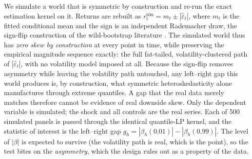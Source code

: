 We simulate a world that is symmetric by construction and re-run the exact
estimation kernel on it. Returns are rebuilt as $r^{\text{sim}}_t = m_t \pm
|\hat{\varepsilon}_t|$, where $m_t$ is the fitted conditional mean and the
sign is an independent Rademacher draw, the sign-flip construction of
the wild-bootstrap literature \citep{wu1986,liu1988,davidson2008}. The
simulated world thus has \emph{zero skew by construction} at every point in
time, while preserving the empirical magnitude sequence exactly: the full
fat-tailed, volatility-clustered path of $|\hat{\varepsilon}_t|$, with no
volatility model imposed at all. Because the sign-flip removes asymmetry
while leaving the volatility path untouched, any left--right gap this world
produces is, by construction, what symmetric heteroskedasticity alone
manufactures through extreme quantiles. A gap that the real data
merely matches therefore cannot be evidence of real downside skew. Only the
dependent variable is simulated;
the shock and all controls are the real series. Each of 500 simulated
panels is passed through the identical quantile-LP kernel, and the
statistic of interest is the left--right gap $g_h = |\beta_h(0.01)| -
|\beta_h(0.99)|$. The level of $|\beta|$ is expected to survive (the
volatility path is real, which is the point), so the test bites on the
\emph{asymmetry}, which the design rules out as a property of the data.

